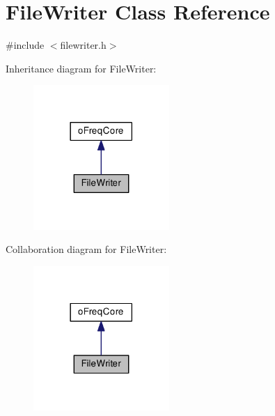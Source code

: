 \hypertarget{class_file_writer}{\section{File\-Writer Class Reference}
\label{class_file_writer}
}


{\ttfamily \#include $<$filewriter.\-h$>$}



Inheritance diagram for File\-Writer\-:\nopagebreak
\begin{figure}[H]
\begin{center}
\leavevmode
\includegraphics[width=146pt]{class_file_writer__inherit__graph}
\end{center}
\end{figure}


Collaboration diagram for File\-Writer\-:\nopagebreak
\begin{figure}[H]
\begin{center}
\leavevmode
\includegraphics[width=146pt]{class_file_writer__coll__graph}
\end{center}
\end{figure}
